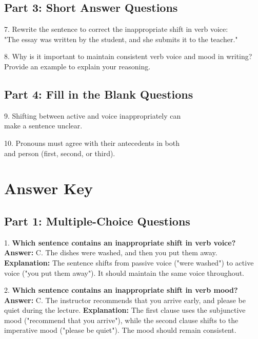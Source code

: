 \documentclass[12pt]{article}
\begin{document}
\vspace{1cm}
\newpage
\subsection*{Part 3: Short Answer Questions}

7. Rewrite the sentence to correct the inappropriate shift in verb voice: \\  
"The essay was written by the student, and she submits it to the teacher."  
\vspace{4cm}

8. Why is it important to maintain consistent verb voice and mood in writing? \\Provide an example to explain your reasoning.  
\vspace{4cm}

\subsection*{Part 4: Fill in the Blank Questions}
\vspace{1cm}
9. Shifting between active and \underline{\hspace{4cm}} voice inappropriately can \\make a sentence unclear.  
\vspace{2cm}

10. Pronouns must agree with their antecedents in both \underline{\hspace{4cm}} \\and person (first, second, or third).  
\vspace{2cm}
\newpage
\section*{Answer Key}

\subsection*{Part 1: Multiple-Choice Questions}

1. \textbf{Which sentence contains an inappropriate shift in verb voice?}  
\textbf{Answer:} C. The dishes were washed, and then you put them away.  
\textbf{Explanation:} The sentence shifts from passive voice ("were washed") to active voice ("you put them away"). It should maintain the same voice throughout.

\vspace{1cm}
2. \textbf{Which sentence contains an inappropriate shift in verb mood?}  
\textbf{Answer:} C. The instructor recommends that you arrive early, and please be quiet during the lecture.  
\textbf{Explanation:} The first clause uses the subjunctive mood ("recommend that you arrive"), while the second clause shifts to the imperative mood ("please be quiet"). The mood should remain consistent.
\end{document}
